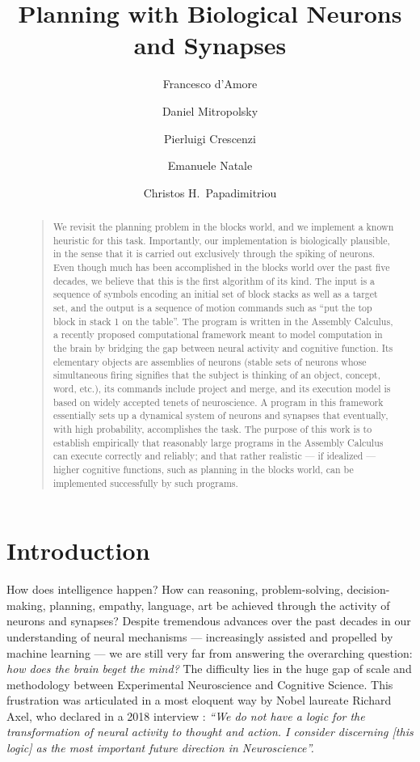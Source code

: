 \documentclass[letterpaper]{article}
\title{Planning with Biological Neurons and Synapses}
\author[1]{Francesco d'Amore}
\author[2]{Daniel Mitropolsky}
\author[3]{Pierluigi Crescenzi}
\author[1]{Emanuele Natale}
\author[2]{Christos H.\ Papadimitriou}
\affil[1]{Universit\'e C\^ote d'Azur, Inria, CNRS, I3S, Sophia Antipolis, France }
\affil[2]{Department of Computer Science, Columbia University, New York, USA }
\affil[3]{Gran Sasso Science Institute, L'Aquila, Italia {\protect\\ \tt \{francesco.d-amore,emanuele.natale\}@inria.fr}{\protect\\ \tt \{dgm2144,christos\}@columbia.edu}{\protect\\ \tt pierluigi.crescenzi@gssi.it}}
\begin{document}
\maketitle              

\begin{abstract}
\begin{quote}
	We revisit the planning problem in the blocks world, and we implement a known heuristic for this task.  Importantly, our implementation is biologically plausible, in the sense that it is carried out exclusively through the spiking of neurons.  Even though much has been accomplished in the blocks world over the past five decades, we believe that this is the first algorithm of its kind.   The input is a sequence of symbols encoding an initial set of block stacks as well as a target set, and the output is a sequence of motion commands such as ``put the top block in stack 1 on the table''.  The program is written in the Assembly Calculus, a recently proposed computational framework meant to model computation in the brain by bridging the gap between neural activity and cognitive function.  Its elementary objects are assemblies of neurons (stable sets of neurons whose simultaneous firing signifies that the subject is thinking of an object, concept, word, etc.), its commands include project and merge, and its execution model is based on widely accepted tenets of neuroscience.  A program in this framework essentially sets up a dynamical system of neurons and synapses that eventually, with high probability, accomplishes the task.  The purpose of this work is to establish empirically that reasonably large programs in the Assembly Calculus can execute correctly and reliably; and that rather realistic --- if idealized --- higher cognitive functions, such as planning in the blocks world, can be implemented successfully by such programs.
\end{quote}
\end{abstract} 



\section{Introduction}\label{sec:intro}
How does intelligence happen?   How can reasoning, problem-solving, decision-making, planning, empathy, language, art be achieved through the activity of neurons and synapses?  Despite tremendous advances over the past decades in our understanding of neural mechanisms --- increasingly assisted and propelled by machine learning --- we are still very far from answering the overarching question: {\em how does the brain beget the mind?}  The difficulty lies in the huge gap of scale and methodology between Experimental Neuroscience and Cognitive Science.  This frustration was articulated in a most eloquent way by Nobel laureate Richard Axel, who declared in a 2018 interview \cite{Axel2018}: {\em ``We do not have a logic for the transformation of neural activity to thought and action. I consider discerning [this logic] as the most important future direction in Neuroscience''.}
\end{document}

